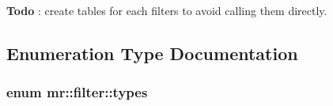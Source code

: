 \begin{Desc}
\item[{\bf Todo}]: create tables for each filters to avoid calling them directly.\end{Desc}


\subsection{Enumeration Type Documentation}
\subsubsection{\setlength{\rightskip}{0pt plus 5cm}enum {\bf mr::filter::types}}\label{namespacemr_1_1filter_a27}


